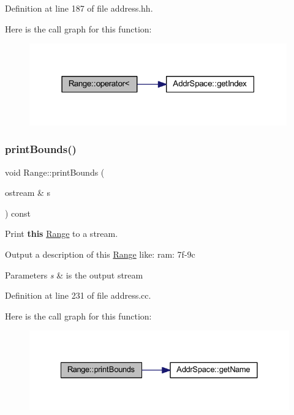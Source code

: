 Definition at line 187 of file address.\+hh.

Here is the call graph for this function\+:
\nopagebreak
\begin{figure}[H]
\begin{center}
\leavevmode
\includegraphics[width=315pt]{class_range_af79209e97d5e8df1e26846b478722909_cgraph}
\end{center}
\end{figure}
\mbox{\label{class_range_a6b1d50b9238ca3d02a08c07f81e1b7c5}} 
\subsubsection{\texorpdfstring{printBounds()}{printBounds()}}
{\footnotesize\ttfamily void Range\+::print\+Bounds (\begin{DoxyParamCaption}\item[{ostream \&}]{s }\end{DoxyParamCaption}) const}



Print {\bfseries{this}} \mbox{\hyperlink{class_range}{Range}} to a stream. 

Output a description of this \mbox{\hyperlink{class_range}{Range}} like\+: ram\+: 7f-\/9c 
\begin{DoxyParams}{Parameters}
{\em s} & is the output stream \\
\hline
\end{DoxyParams}


Definition at line 231 of file address.\+cc.

Here is the call graph for this function\+:
\nopagebreak
\begin{figure}[H]
\begin{center}
\leavevmode
\includegraphics[width=328pt]{class_range_a6b1d50b9238ca3d02a08c07f81e1b7c5_cgraph}
\end{center}
\end{figure}
\mbox{\label{class_range_ad88a42471281f5bc6abf1dc1fb79f12b}} 
